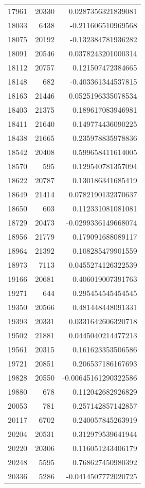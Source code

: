 \begin{tabular}{r | r | r}
17961 & 20330 & 0.0287356321839081 \\
18033 & 6438 & -0.211606510969568 \\
18075 & 20192 & -0.132384781936282 \\
18091 & 20546 & 0.0378243201000314 \\
18112 & 20757 & 0.121507472384665 \\
18148 & 682 & -0.403361344537815 \\
18163 & 21446 & 0.0525196335078534 \\
18403 & 21375 & 0.189617083946981 \\
18411 & 21640 & 0.149774436090225 \\
18438 & 21665 & 0.235978835978836 \\
18542 & 20408 & 0.599658411614005 \\
18570 & 595 & 0.129540781357094 \\
18622 & 20787 & 0.130186341685419 \\
18649 & 21414 & 0.0782190132370637 \\
18650 & 603 & 0.112331081081081 \\
18729 & 20473 & -0.0299336149668074 \\
18956 & 21779 & 0.179091688089117 \\
18964 & 21392 & 0.108285479901559 \\
18973 & 7113 & 0.0455274126322539 \\
19166 & 20681 & 0.406019007391763 \\
19271 & 644 & 0.295454545454545 \\
19350 & 20566 & 0.481448448091331 \\
19393 & 20331 & 0.0331642606320718 \\
19502 & 21881 & 0.0445040214477213 \\
19561 & 20315 & 0.161623353506586 \\
19721 & 20851 & 0.206537186167693 \\
19828 & 20550 & -0.00645161290322586 \\
19880 & 678 & 0.112042682926829 \\
20053 & 781 & 0.257142857142857 \\
20117 & 6702 & 0.240057845263919 \\
20204 & 20531 & 0.312979539641944 \\
20220 & 20306 & 0.116051243406179 \\
20248 & 5595 & 0.768627450980392 \\
20336 & 5286 & -0.0414507772020725 \\

\end{tabular}
